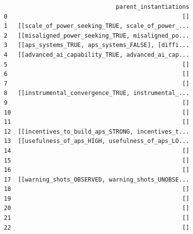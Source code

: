 \documentclass[
  11pt,
  letterpaper,
]{book}
\begin{document}
\begin{verbatim}
                                parent_instantiations  
0                                                  []  
1   [[scale_of_power_seeking_TRUE, scale_of_power_...  
2   [[misaligned_power_seeking_TRUE, misaligned_po...  
3   [[aps_systems_TRUE, aps_systems_FALSE], [diffi...  
4   [[advanced_ai_capability_TRUE, advanced_ai_cap...  
5                                                  []  
6                                                  []  
7                                                  []  
8   [[instrumental_convergence_TRUE, instrumental_...  
9                                                  []  
10                                                 []  
11                                                 []  
12  [[incentives_to_build_aps_STRONG, incentives_t...  
13  [[usefulness_of_aps_HIGH, usefulness_of_aps_LO...  
14                                                 []  
15                                                 []  
16                                                 []  
17  [[warning_shots_OBSERVED, warning_shots_UNOBSE...  
18                                                 []  
19                                                 []  
20                                                 []  
21                                                 []  
22                                                 []  
\end{verbatim}
\end{document}

